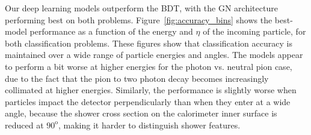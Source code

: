 Our deep learning models outperform the BDT, with the GN architecture performing best on both problems. Figure~\ref{fig:accuracy_bins} shows the best-model performance as a function of the energy and $\eta$ of the incoming particle, for both classification problems. These figures show that classification accuracy is maintained over a wide range of particle energies and angles. The models appear to perform a bit worse at higher energies for the photon vs. neutral pion case, due to the fact that the pion to two photon decay becomes increasingly collimated at higher energies. Similarly, the performance is slightly worse when particles impact the detector perpendicularly than when they enter at a wide angle, because the shower cross section on the calorimeter inner surface is reduced at $90^{\mathrm o}$, making it harder to distinguish shower features.

